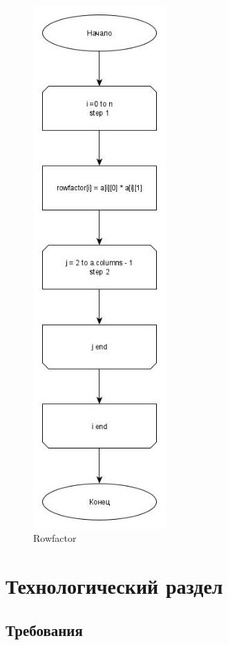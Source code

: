 \documentclass[a4paper, 14pt]{article}
\begin{document}
	\vspace{1cm}
	
	\begin{figure}[]
		\centering
		\includegraphics[height=20cm]{Схемы/rowfactor}
		\caption{Rowfactor}
		\label{fig:rowfactor}
	\end{figure}
	
	
	\newpage
	\section{Технологический раздел}
	
	\subsection{Требования}
	
\end{document}
